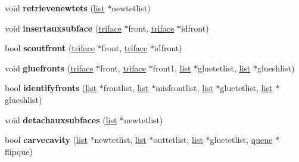 \begin{DoxyCompactItemize}
\item 
\hypertarget{classtetgenmesh_a6054dacf015df733c26d8e55dd7aa364}{void {\bfseries retrievenewtets} (\hyperlink{classtetgenmesh_1_1list}{list} $\ast$newtetlist)}\label{classtetgenmesh_a6054dacf015df733c26d8e55dd7aa364}

\item 
\hypertarget{classtetgenmesh_ac401d13653745623454abfd470c5f51d}{void {\bfseries insertauxsubface} (\hyperlink{classtetgenmesh_1_1triface}{triface} $\ast$front, \hyperlink{classtetgenmesh_1_1triface}{triface} $\ast$idfront)}\label{classtetgenmesh_ac401d13653745623454abfd470c5f51d}

\item 
\hypertarget{classtetgenmesh_a45c888cf88de43b40294ed8351a133c8}{bool {\bfseries scoutfront} (\hyperlink{classtetgenmesh_1_1triface}{triface} $\ast$front, \hyperlink{classtetgenmesh_1_1triface}{triface} $\ast$idfront)}\label{classtetgenmesh_a45c888cf88de43b40294ed8351a133c8}

\item 
\hypertarget{classtetgenmesh_a56519777a64d9deab7eb74a6cac693cf}{void {\bfseries gluefronts} (\hyperlink{classtetgenmesh_1_1triface}{triface} $\ast$front, \hyperlink{classtetgenmesh_1_1triface}{triface} $\ast$front1, \hyperlink{classtetgenmesh_1_1list}{list} $\ast$gluetetlist, \hyperlink{classtetgenmesh_1_1list}{list} $\ast$glueshlist)}\label{classtetgenmesh_a56519777a64d9deab7eb74a6cac693cf}

\item 
\hypertarget{classtetgenmesh_aee5e8d0c0c47120ab1338e99473b6172}{bool {\bfseries identifyfronts} (\hyperlink{classtetgenmesh_1_1list}{list} $\ast$frontlist, \hyperlink{classtetgenmesh_1_1list}{list} $\ast$misfrontlist, \hyperlink{classtetgenmesh_1_1list}{list} $\ast$gluetetlist, \hyperlink{classtetgenmesh_1_1list}{list} $\ast$glueshlist)}\label{classtetgenmesh_aee5e8d0c0c47120ab1338e99473b6172}

\item 
\hypertarget{classtetgenmesh_a060f8adb24ea69864071ad623a46f09a}{void {\bfseries detachauxsubfaces} (\hyperlink{classtetgenmesh_1_1list}{list} $\ast$newtetlist)}\label{classtetgenmesh_a060f8adb24ea69864071ad623a46f09a}

\item 
\hypertarget{classtetgenmesh_abc7a428900a9d4932d99f2afbdad4ab7}{bool {\bfseries carvecavity} (\hyperlink{classtetgenmesh_1_1list}{list} $\ast$newtetlist, \hyperlink{classtetgenmesh_1_1list}{list} $\ast$outtetlist, \hyperlink{classtetgenmesh_1_1list}{list} $\ast$gluetetlist, \hyperlink{classtetgenmesh_1_1queue}{queue} $\ast$flipque)}\label{classtetgenmesh_abc7a428900a9d4932d99f2afbdad4ab7}


\end{DoxyCompactItemize}

